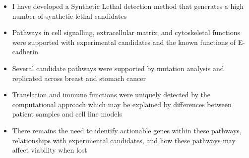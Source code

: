     
  \begin{itemize}
   \item I have developed a Synthetic Lethal detection method that generates a high number of \gls{synthetic lethal} candidates
   
   \bigskip
   
   \item Pathways in cell signalling, extracellular matrix, and cytoskeletal functions were supported with experimental candidates and the known functions of \gls{E-cadherin}
   
   \bigskip
   
   \item Several candidate \glspl{pathway} were supported by \gls{mutation} analysis and replicated across breast and stomach cancer
   
   \bigskip
   
   \item Translation and immune functions were uniquely detected by the computational approach which may be explained by differences between patient samples and cell line models
   
   \bigskip
   
   \item There remains the need to identify actionable genes within these \glspl{pathway}, relationships with experimental candidates, and how these \glspl{pathway} may affect viability when lost
  \end{itemize}
  \fi